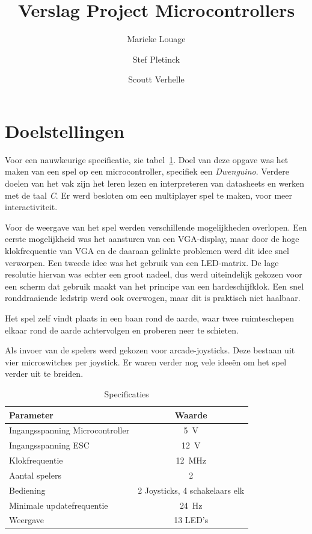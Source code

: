 \documentclass[12pt]{ugentreport}
\title{Verslag Project Microcontrollers}
\author{Marieke Louage\and Stef Pletinck\and Scoutt Verhelle}
\begin{document}
\maketitle

\tableofcontents
\listoffigures
\listoftodos
\newpage

\section{Doelstellingen}
Voor een nauwkeurige specificatie, zie tabel~\ref{tbl:specs}.
Doel van deze opgave was het maken van een spel op een microcontroller,
specifiek een \emph{Dwenguino}.
Verdere doelen van het vak zijn het leren lezen en interpreteren van datasheets
en werken met de taal \emph{C}.
Er werd besloten om een multiplayer spel te maken,
voor meer interactiviteit.

Voor de weergave van het spel werden verschillende mogelijkheden overlopen.
Een eerste mogelijkheid was het aansturen van een VGA-display,
maar door de hoge klokfrequentie van VGA en de daaraan gelinkte problemen
werd dit idee snel verworpen.
Een tweede idee was het gebruik van een LED-matrix.
De lage resolutie hiervan was echter een groot nadeel,
dus werd uiteindelijk gekozen voor een scherm dat gebruik maakt
van het principe van een hardeschijfklok. Een snel ronddraaiende ledstrip werd
ook overwogen, maar dit is praktisch niet haalbaar.

Het spel zelf vindt plaats in een baan rond de aarde, waar twee ruimteschepen
elkaar rond de aarde achtervolgen en proberen neer te schieten.

Als invoer van de spelers werd gekozen voor arcade-joysticks.
Deze bestaan uit vier microswitches per joystick.
Er waren verder nog vele ideeën om het spel verder uit te breiden.

\begin{table}
  \centering
  \begin{tabular}{l|c}
    \hline
    Parameter & Waarde\\
    \hline
    Ingangsspanning Microcontroller & \SI{5}{\volt}\\
    Ingangsspanning ESC & \SI{12}{\volt}\\
    Klokfrequentie & \SI{12}{\mega\hertz}\\
    Aantal spelers & 2\\
    Bediening & 2 Joysticks, 4 schakelaars elk\\
    Minimale updatefrequentie & \SI{24}{\hertz}\\
    Weergave & 13 LED's\\
    \hline
  \end{tabular}
  \caption{Specificaties}
  \label{tbl:specs}
\end{table}
\end{document}

